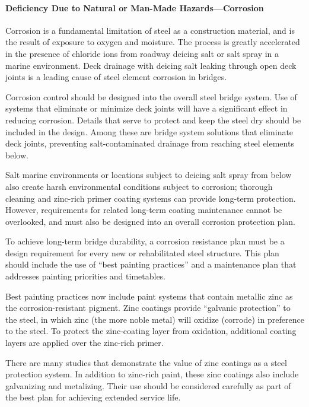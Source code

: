 \paragraph{Deficiency Due to Natural or Man-Made Hazards—Corrosion}
Corrosion is a fundamental limitation of steel as a construction material, and is the result of exposure to oxygen
and moisture. The process is greatly accelerated in the presence of chloride ions from roadway deicing salt or salt
spray in a marine environment. Deck drainage with deicing salt leaking through open deck joints is a leading cause of
steel element corrosion in bridges.

Corrosion control should be designed into the overall steel bridge system. Use of systems that eliminate or
minimize deck joints will have a significant effect in reducing corrosion. Details that serve to protect and keep the
steel dry should be included in the design. Among these are bridge system solutions that eliminate deck joints,
preventing salt-contaminated drainage from reaching steel elements below.

Salt marine environments or locations subject to deicing salt spray from below also create harsh environmental
conditions subject to corrosion; thorough cleaning and zinc-rich primer coating systems can provide long-term
protection. However, requirements for related long-term coating maintenance cannot be overlooked, and must also be
designed into an overall corrosion protection plan.

To achieve long-term bridge durability, a corrosion resistance plan must be a design requirement for every new
or rehabilitated steel structure. This plan should include the use of “best painting practices” and a maintenance plan
that addresses painting priorities and timetables.

Best painting practices now include paint systems that contain metallic zinc as the corrosion-resistant pigment.
Zinc coatings provide “galvanic protection” to the steel, in which zinc (the more noble metal) will oxidize (corrode)
in preference to the steel. To protect the zinc-coating layer from oxidation, additional coating layers are applied over
the zinc-rich primer.

There are many studies that demonstrate the value of zinc coatings as a steel protection system. In addition to
zinc-rich paint, these zinc coatings also include galvanizing and metalizing. Their use should be considered carefully
as part of the best plan for achieving extended service life.

